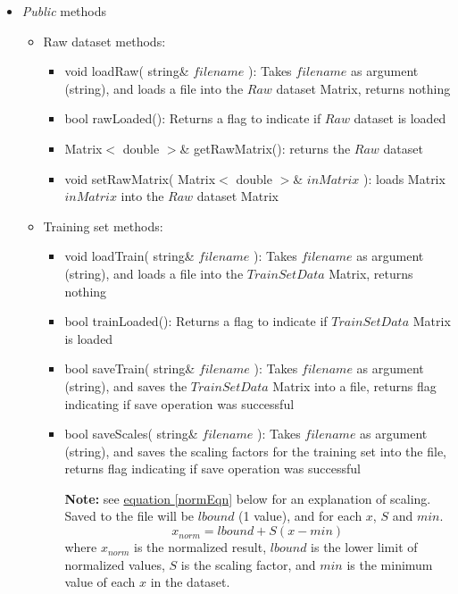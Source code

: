 \documentclass{report}
\def\beginred{\color{red}}
\def\endcolor{\color{black}}
\begin{document}
\begin{itemize}

\item {\em Public} methods

\begin{itemize}

\item Raw dataset methods:
\begin{itemize}
\item void loadRaw( string\& $filename$ ): Takes $filename$ as
      argument (string), and loads a file into the $Raw$ dataset
      Matrix, returns nothing
\item bool rawLoaded(): Returns a flag to indicate if $Raw$ dataset is
      loaded
\item Matrix$<$ double $>$\& getRawMatrix(): returns the $Raw$ dataset
\item void setRawMatrix( Matrix$<$ double $>$\& $inMatrix$ ): loads
      Matrix $inMatrix$ into the $Raw$ dataset Matrix
\end{itemize}

\item Training set methods:
\begin{itemize}
\item void loadTrain( string\& $filename$ ): Takes $filename$ as
      argument (string), and loads a file into the $TrainSetData$
      Matrix, returns nothing
\item \beginred bool trainLoaded(): Returns a flag to indicate if
      $TrainSetData$ Matrix is loaded \endcolor
\item bool saveTrain( string\& $filename$ ): Takes $filename$ as
      argument (string), and saves the $TrainSetData$ Matrix into a
      file, returns flag indicating if save operation was successful
\item bool saveScales( string\& $filename$ ): Takes $filename$ as
      argument (string), and saves the scaling factors for the
      training set into the file, returns flag indicating if save
      operation was successful

{\bf Note:} see \hyperref[normEqn]{equation \ref{normEqn}} below for
an explanation of scaling.  Saved to the file will be $lbound$ (1
value), and for each $x$, $S$ and $min$.
\begin{equation}
x_{norm} = lbound + S(x - min)
\end{equation}
where $x_{norm}$ is the normalized result, $lbound$ is the lower limit
of normalized values, $S$ is the scaling factor, and $min$ is the
minimum value of each $x$ in the dataset.


\end{itemize}
\end{itemize}
\end{itemize}
\end{document}
